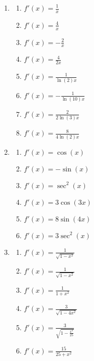 \documentclass[a4paper,12pt]{article}
\begin{document}
\begin{enumerate}
\item
    \begin{multicols}{2}
    \begin{enumerate}
    \item \spacer$f'(x) = \frac{1}{x}$
    \item \spacer$f'(x) = \frac{4}{x}$
    \item \spacer$f'(x) = -\frac{2}{x}$
    \item \spacer$f'(x) = \frac{4}{2x}$
    \item \spacer$f'(x) = \frac{1}{\ln(2)x}$
    \item \spacer$f'(x) = -\frac{1}{\ln(10)x}$
    \item \spacer$f'(x) = \frac{2}{2\ln(3)x}$
    \item \spacer$f'(x) = \frac{8}{4\ln(2)x}$
    \end{enumerate}
    \end{multicols}

\newpage
\item
    \begin{multicols}{2}
    \begin{enumerate}
    \item \sspacer$f'(x) = \cos(x)$
    \item \sspacer$f'(x) = -\sin(x)$
    \item \sspacer$f'(x) = \sec^2(x)$
    \item \sspacer$f'(x) = 3\cos(3x)$
    \item \sspacer$f'(x) = 8\sin(4x)$
    \item \sspacer$f'(x) = 3\sec^2(x)$
    \end{enumerate}
    \end{multicols}

\item
    \begin{multicols}{2}
    \begin{enumerate}
    \item \spacer$f'(x) = \frac{1}{\sqrt{1-x^2}}$
    \item \spacer$f'(x) = \frac{1}{\sqrt{1-x^2}}$
    \item \spacer$f'(x) = \frac{1}{1+x^2}$
    \item \spacer$f'(x) = \frac{3}{\sqrt{1-4x^2}}$
    \item \spacer$f'(x) = \frac{3}{\sqrt{1-\frac{x^2}{25}}}$
    \item \spacer$f'(x) = \frac{15}{25 + x^2}$
    \end{enumerate}
    \end{multicols}

\end{enumerate}
\end{document}

